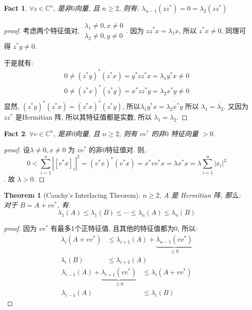 \documentclass{article}
\newtheorem{fact}{Fact}
\newtheorem{theorem}{Theorem}
\begin{document}
\begin{fact}
  $\forall z\in \mathbb{C}^n$, 是非$0$向量, 且 $n\geq 2$, 则有:
  $\lambda_{n-1}(zz^*) = 0 = \lambda_2(zz^*)$
\end{fact}
\begin{proof}[proof]
  考虑两个特征值对, $\substack{\lambda_1 \not= 0, x\not= 0 \\ \lambda_2 \not=0, y\not=0}$.
  因为 $zz^*x = \lambda_1x$, 所以 $z^*x \not= 0$, 同理可得 $z^*y\not=0$.
  
  于是就有:
  \begin{align*}
    0 \not= (z^*y)^*(z^*x) = y^*zz^*x = \lambda_1 y^*x \not= 0 \\
    0 \not= (z^*x)^*(z^*y) = x^*zz^*y = \lambda_2 x^*y \not= 0 
  \end{align*}
  显然, $(z^*y)^*(z^*x) = \overline{(z^*x)^*(z^*y)}$, 所以$\lambda_1y^*x = \overline{\lambda_2x^*y}$
  所以 $\lambda_1 = \overline{\lambda_2}$.
  又因为 $zz^*$ 是Hermitian 阵, 所以其特征值都是实数, 所以 $\lambda_1 = \lambda_2$.
\end{proof}
\begin{fact}
  $\forall v\in\mathbb{C}^n$, 是非0向量, 且 $n \geq 2$, 则有 $vv^*$ 的非$0$ 特征向量 $>0$.
\end{fact}
\begin{proof}[proof]
  设$\lambda \not=0, x\not=0$ 为 $vv^*$ 的非$0$特征值对. 则,
  \[0 < \sum_{i=1}^n |[v^*x]_i|^2 = (v^*x)^*(v^*x) = x^*vv^*x = \lambda x^*x = \lambda \sum_{i=1}^n |x_i|^2\].
  故 $\lambda > 0$.
\end{proof}
\begin{theorem}[Cauchy's Interlacing Theorem]
  $n \geq 2$, $A$ 是 Hermitian 阵, 那么: 对于 $B = A + vv^*$, 有:
  \[\lambda_1(A) \leq \lambda_1(B) \leq \cdots \leq \lambda_{n}(A) \leq \lambda_n(B)\]
\end{theorem}
\begin{proof}[proof]
  因为 $vv^*$ 有最多1个正特征值, 且其他的特征值都为0, 所以:
  \begin{align*}
    \lambda_i(A + vv^*) &\leq \lambda_{i+1}(A) + \underbrace{\lambda_{n-1}(vv^*)}_{\leq 0} \\
    \lambda_i(B) &\leq \lambda_{i+1}(A)
  \end{align*}
  \begin{align*}
    \lambda_{i-1}(A) + \underbrace{\lambda_{i+1}(vv^*)}_{\geq 0} &\leq \lambda_i(A + vv^*) \\
    \lambda_{i-1}(A) &\leq \lambda_i(B)
  \end{align*}
\end{proof}
\end{document}
